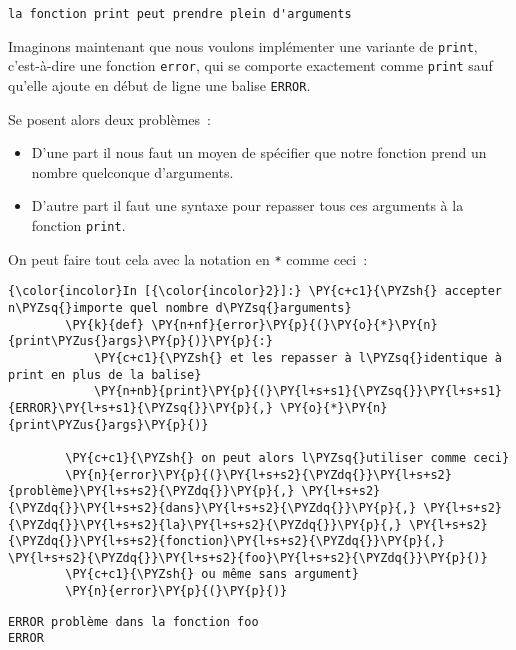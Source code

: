     \begin{Verbatim}[commandchars=\\\{\}]
la fonction print peut prendre plein d'arguments

    \end{Verbatim}

    Imaginons maintenant que nous voulons implémenter une variante de
\texttt{print}, c'est-à-dire une fonction \texttt{error}, qui se
comporte exactement comme \texttt{print} sauf qu'elle ajoute en début de
ligne une balise \texttt{ERROR}.

Se posent alors deux problèmes~:

\begin{itemize}
\tightlist
\item
  D'une part il nous faut un moyen de spécifier que notre fonction prend
  un nombre quelconque d'arguments.
\item
  D'autre part il faut une syntaxe pour repasser tous ces arguments à la
  fonction \texttt{print}.
\end{itemize}

On peut faire tout cela avec la notation en \texttt{*} comme ceci~:

    \begin{Verbatim}[commandchars=\\\{\}]
{\color{incolor}In [{\color{incolor}2}]:} \PY{c+c1}{\PYZsh{} accepter n\PYZsq{}importe quel nombre d\PYZsq{}arguments}
        \PY{k}{def} \PY{n+nf}{error}\PY{p}{(}\PY{o}{*}\PY{n}{print\PYZus{}args}\PY{p}{)}\PY{p}{:}
            \PY{c+c1}{\PYZsh{} et les repasser à l\PYZsq{}identique à print en plus de la balise}
            \PY{n+nb}{print}\PY{p}{(}\PY{l+s+s1}{\PYZsq{}}\PY{l+s+s1}{ERROR}\PY{l+s+s1}{\PYZsq{}}\PY{p}{,} \PY{o}{*}\PY{n}{print\PYZus{}args}\PY{p}{)}
        
        \PY{c+c1}{\PYZsh{} on peut alors l\PYZsq{}utiliser comme ceci}
        \PY{n}{error}\PY{p}{(}\PY{l+s+s2}{\PYZdq{}}\PY{l+s+s2}{problème}\PY{l+s+s2}{\PYZdq{}}\PY{p}{,} \PY{l+s+s2}{\PYZdq{}}\PY{l+s+s2}{dans}\PY{l+s+s2}{\PYZdq{}}\PY{p}{,} \PY{l+s+s2}{\PYZdq{}}\PY{l+s+s2}{la}\PY{l+s+s2}{\PYZdq{}}\PY{p}{,} \PY{l+s+s2}{\PYZdq{}}\PY{l+s+s2}{fonction}\PY{l+s+s2}{\PYZdq{}}\PY{p}{,} \PY{l+s+s2}{\PYZdq{}}\PY{l+s+s2}{foo}\PY{l+s+s2}{\PYZdq{}}\PY{p}{)}
        \PY{c+c1}{\PYZsh{} ou même sans argument}
        \PY{n}{error}\PY{p}{(}\PY{p}{)}
\end{Verbatim}


    \begin{Verbatim}[commandchars=\\\{\}]
ERROR problème dans la fonction foo
ERROR

    \end{Verbatim}

